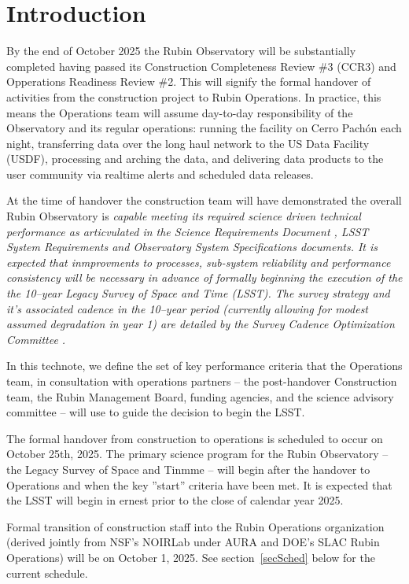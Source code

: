 \section{Introduction}

By the end of October 2025 the Rubin Observatory will be substantially completed having passed its Construction Completeness Review \#3 (CCR3) and Opperations Readiness Review \#2.  This will signify the formal handover of activities from the construction project to Rubin Operations. In practice, this means the Operations team \cite[see][]{RDO-018} will assume day-to-day responsibility of the Observatory and its regular operations: running the facility on Cerro Pach\'{o}n each night, transferring data over the long haul network to the US Data Facility (USDF), processing and arching the data, and delivering data products to the user community via realtime alerts and scheduled data releases. 

At the time of handover the construction team will have demonstrated the overall Rubin Observatory is \it{capable} meeting its required science driven technical performance as articvulated in the Science Requirements Document \cite{SRD}, LSST System Requirements \cite{LSR} and Observatory System Specifications \cite{OSS} documents.  It is expected that inmprovments to processes, sub-system reliability and performance consistency will be necessary in advance of formally beginning the execution of the the 10--year Legacy Survey of Space and Time (LSST). The survey strategy and it's associated cadence in the 10--year period (currently allowing for modest assumed degradation in year 1) are detailed by the Survey Cadence Optimization Committee \cite[SCOC,][]{PSTN-056}. 

In this technote, we define the set of key performance criteria that the Operations team, in consultation with operations partners -- the post-handover Construction team, the Rubin Management Board, funding agencies, and the science advisory committee -- will use to guide the decision to begin the LSST. 

The formal handover from construction to operations is scheduled to occur on October 25th, 2025. The primary science program for the Rubin Observatory -- the Legacy Survey of Space and Tinmme -- will begin after the handover to Operations and when the key ''start'' criteria have been met.  It is expected that the LSST will begin in ernest prior to the close of calendar year 2025.

Formal transition of construction staff into the Rubin Operations organization (derived jointly from NSF's NOIRLab under AURA and DOE's SLAC Rubin Operations) will be on October 1, 2025. See section~\ref{secSched} below for the current schedule.  
